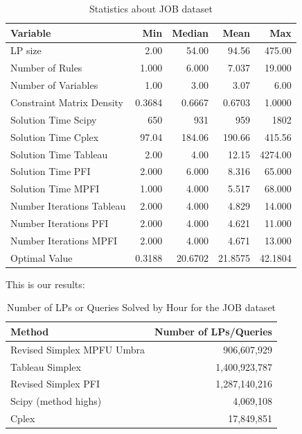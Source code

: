 \begin{table}[!htb]
    \centering
    \caption{Statistics about JOB dataset}
    \begin{tabular}{lrrrr}
        \toprule
        Variable                  & Min    & Median  & Mean    & Max     \\
        \midrule
        LP size                   & 2.00   & 54.00   & 94.56   & 475.00  \\
        Number of Rules           & 1.000  & 6.000   & 7.037   & 19.000  \\
        Number of Variables       & 1.00   & 3.00    & 3.07    & 6.00    \\
        Constraint Matrix Density & 0.3684 & 0.6667  & 0.6703  & 1.0000  \\
        Solution Time Scipy       & 650    & 931     & 959     & 1802    \\
        Solution Time Cplex       & 97.04  & 184.06  & 190.66  & 415.56  \\
        Solution Time Tableau     & 2.00   & 4.00    & 12.15   & 4274.00 \\
        Solution Time PFI         & 2.000  & 6.000   & 8.316   & 65.000  \\
        Solution Time MPFI        & 1.000  & 4.000   & 5.517   & 68.000  \\
        Number Iterations Tableau & 2.000  & 4.000   & 4.829   & 14.000  \\
        Number Iterations PFI     & 2.000  & 4.000   & 4.621   & 11.000  \\
        Number Iterations MPFI    & 2.000  & 4.000   & 4.671   & 13.000  \\
        Optimal Value             & 0.3188 & 20.6702 & 21.8575 & 42.1804 \\
        \bottomrule
    \end{tabular}
    \label{table_job_stats}
\end{table} 

This is our results:
\begin{table}[!htb]
    \centering
    \caption{Number of LPs or Queries Solved by Hour for the JOB dataset}
    \begin{tabular}{l|r}
        \toprule
        Method                     & Number of LPs/Queries \\
        \midrule
        Revised Simplex MPFU Umbra & 906,607,929           \\
        Tableau Simplex            & 1,400,923,787         \\
        Revised Simplex PFI        & 1,287,140,216         \\
        Scipy (method highs)       & 4,069,108             \\
        Cplex                      & 17,849,851            \\
        \bottomrule
    \end{tabular}
    \label{table_lps_hr_job}
\end{table} 


